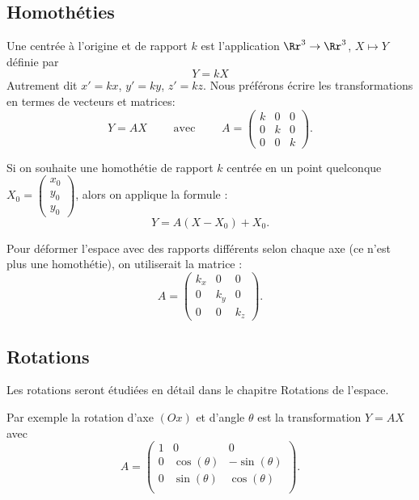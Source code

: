 \documentclass[11pt,class=report,crop=false]{standalone}
\begin{document}

\subsection{Homothéties}


Une  centrée à l'origine et de rapport $k$ est l'application $\Rr^3 \to \Rr^3$, $X \mapsto Y$ définie par 
$$Y = k X$$
Autrement dit $x'=kx$, $y'=ky$, $z'=kz$. Nous préférons écrire les transformations en termes de vecteurs et matrices:
$$Y = AX \qquad \text{ avec } \qquad A = \begin{pmatrix}k&0&0\\0&k&0\\0&0&k\end{pmatrix}.$$



Si on souhaite une homothétie de rapport $k$ centrée en un point quelconque $X_0 = \left( \begin{smallmatrix}x_0\\y_0\\y_0 \end{smallmatrix} \right)$, alors on applique la formule :
$$Y = A(X-X_0) + X_0.$$

Pour déformer l'espace avec des rapports différents selon chaque axe (ce n'est plus une homothétie), on utiliserait la matrice :
$$A = \begin{pmatrix}k_x&0&0\\0&k_y&0\\0&0&k_z\end{pmatrix}.$$



\subsection{Rotations}


Les rotations seront étudiées en détail dans le chapitre \og{}Rotations de l'espace\fg{}.

Par exemple la rotation d'axe $(Ox)$ et d'angle $\theta$ est la transformation $Y=AX$ avec
$$A = 
\begin{pmatrix}
1 & 0 & 0 \\	
0 & \cos(\theta) & - \sin(\theta) \\
0 & \sin(\theta) & \cos(\theta) \\
\end{pmatrix}.$$
\end{document}
